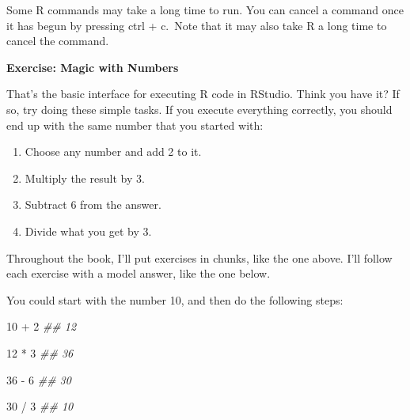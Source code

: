 \documentclass[
  letterpaper,
  DIV=11,
  numbers=noendperiod]{scrbook}
\newenvironment{Shaded}{\begin{snugshade}}{\end{snugshade}}
\newcommand{\DecValTok}[1]{\textcolor[rgb]{0.68,0.00,0.00}{#1}}
\newcommand{\DocumentationTok}[1]{\textcolor[rgb]{0.37,0.37,0.37}{\textit{#1}}}
\newcommand{\SpecialCharTok}[1]{\textcolor[rgb]{0.37,0.37,0.37}{#1}}
\providecommand{\tightlist}{%
  \setlength{\itemsep}{0pt}\setlength{\parskip}{0pt}}
\begin{document}
\begin{tcolorbox}[enhanced jigsaw, breakable, colback=white, colbacktitle=quarto-callout-important-color!10!white, arc=.35mm, bottomrule=.15mm, coltitle=black, left=2mm, rightrule=.15mm, colframe=quarto-callout-important-color-frame, leftrule=.75mm, opacitybacktitle=0.6, bottomtitle=1mm, toptitle=1mm, titlerule=0mm, opacityback=0, title=\textcolor{quarto-callout-important-color}{\faExclamation}\hspace{0.5em}{Important}, toprule=.15mm]

Some R commands may take a long time to run. You can cancel a command
once it has begun by pressing ctrl + c.~Note that it may also take R a
long time to cancel the command.

\end{tcolorbox}

\begin{tcolorbox}[enhanced jigsaw, left=2mm, breakable, colback=white, colframe=quarto-callout-color-frame, leftrule=.75mm, bottomrule=.15mm, arc=.35mm, opacityback=0, rightrule=.15mm, toprule=.15mm]

\vspace{-3mm}\textbf{Exercise: Magic with Numbers}\vspace{3mm}

That's the basic interface for executing R code in RStudio. Think you
have it? If so, try doing these simple tasks. If you execute everything
correctly, you should end up with the same number that you started with:

\begin{enumerate}
\def\labelenumi{\arabic{enumi}.}
\tightlist
\item
  Choose any number and add 2 to it.
\item
  Multiply the result by 3.
\item
  Subtract 6 from the answer.
\item
  Divide what you get by 3.
\end{enumerate}

\end{tcolorbox}

Throughout the book, I'll put exercises in chunks, like the one above.
I'll follow each exercise with a model answer, like the one below.

You could start with the number 10, and then do the following steps:

\begin{Shaded}
\begin{Highlighting}[]
\DecValTok{10} \SpecialCharTok{+} \DecValTok{2}
\DocumentationTok{\#\# 12}

\DecValTok{12} \SpecialCharTok{*} \DecValTok{3}
\DocumentationTok{\#\# 36}

\DecValTok{36} \SpecialCharTok{{-}} \DecValTok{6}
\DocumentationTok{\#\# 30}

\DecValTok{30} \SpecialCharTok{/} \DecValTok{3}
\DocumentationTok{\#\# 10}
\end{Highlighting}
\end{Shaded}
\end{document}
